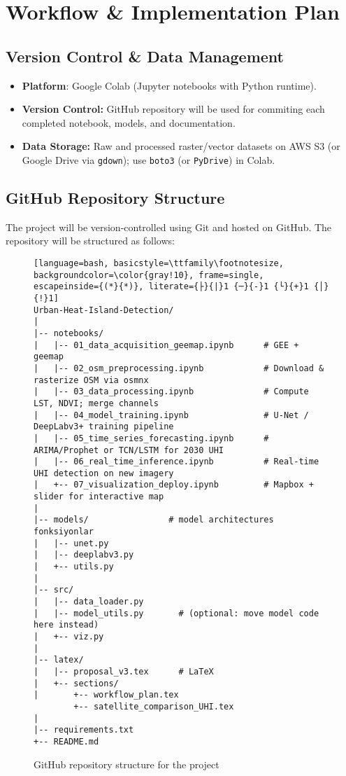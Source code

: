 \documentclass{article}
\begin{document}
\section{Workflow \& Implementation Plan}
\subsection{Version Control \& Data Management}
\begin{itemize}
     \item \textbf{Platform}: Google Colab (Jupyter notebooks with Python runtime).
    \item \textbf{Version Control:} GitHub repository will be used for commiting each completed notebook, models, and documentation. 
    \item \textbf{Data Storage:} Raw and processed raster/vector datasets on AWS S3 (or Google Drive via \texttt{gdown}); use \texttt{boto3} (or \texttt{PyDrive}) in Colab.
\end{itemize}

\clearpage

\subsection{GitHub Repository Structure}

The project will be version-controlled using Git and hosted on GitHub. The repository will be structured as follows:

\begin{figure}[!htbp]
\begin{lstlisting}[language=bash, basicstyle=\ttfamily\footnotesize, backgroundcolor=\color{gray!10}, frame=single, escapeinside={(*}{*)}, literate={├}{|}1 {─}{-}1 {└}{+}1 {│}{!}1]
Urban-Heat-Island-Detection/
|
|-- notebooks/
|   |-- 01_data_acquisition_geemap.ipynb      # GEE + geemap 
|   |-- 02_osm_preprocessing.ipynb            # Download & rasterize OSM via osmnx
|   |-- 03_data_processing.ipynb              # Compute LST, NDVI; merge channels
|   |-- 04_model_training.ipynb               # U-Net / DeepLabv3+ training pipeline
|   |-- 05_time_series_forecasting.ipynb      # ARIMA/Prophet or TCN/LSTM for 2030 UHI
|   |-- 06_real_time_inference.ipynb          # Real-time UHI detection on new imagery
|   +-- 07_visualization_deploy.ipynb         # Mapbox + slider for interactive map
|
|-- models/                # model architectures fonksiyonlar
|   |-- unet.py
|   |-- deeplabv3.py
|   +-- utils.py
|
|-- src/
|   |-- data_loader.py
|   |-- model_utils.py       # (optional: move model code here instead)
|   +-- viz.py
|
|-- latex/
|   |-- proposal_v3.tex      # LaTeX 
|   +-- sections/
|       +-- workflow_plan.tex  
        +-- satellite_comparison_UHI.tex  
|
|-- requirements.txt
+-- README.md
\end{lstlisting}
\caption{GitHub repository structure for the project}
\label{fig:repo_structure}
\end{figure}
\end{document}

